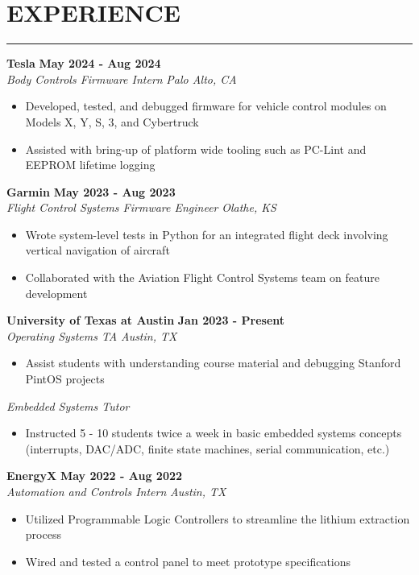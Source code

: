 \documentclass{article}
\newcommand{\sectionHeader}[1]{%
    \vspace{-1.5\baselineskip}
    \section*{\MakeUppercase{\large #1}} %
    \vspace{-1.75\baselineskip} %
    \color{teal}
    \rule{\textwidth}{2pt} %
    \color{black}
    \vspace{-1.5\baselineskip}
}
\newcommand{\role}[3]{
    \textit{#1} \hfill \textit{#2} \\[0pt]
    #3
}
\newcommand{\sectionItem}[5]{ %
    \textbf{#1} \hfill \textbf{#2} \\[0pt]
    \role{#3}{#4}{#5}    %
    \vspace{10pt}
}
\begin{document}
\sectionHeader{experience}
\begin{flushleft}
    \sectionItem{Tesla}{May 2024 - Aug 2024}{Body Controls Firmware Intern}{Palo Alto, CA}{
        \begin{itemize}
            \item[\textbullet] Developed, tested, and debugged firmware for vehicle control modules on Models X, Y, S, 3, and Cybertruck
            \item[\textbullet] Assisted with bring-up of platform wide tooling such as PC-Lint and EEPROM lifetime logging
        \end{itemize}   
    }
    
    \sectionItem{Garmin}{May 2023 - Aug 2023}{Flight Control Systems Firmware Engineer}{Olathe, KS}{
        \begin{itemize}
            \item[\textbullet] Wrote system-level tests in Python for an integrated flight deck involving vertical navigation of aircraft
            \item[\textbullet] Collaborated with the Aviation Flight Control Systems team on feature development
        \end{itemize}
    }

    \sectionItem{University of Texas at Austin}{Jan 2023 - Present}{Operating Systems TA}{Austin, TX}{
        \begin{itemize}
            \item[\textbullet] Assist students with understanding course material and debugging Stanford PintOS projects
        \end{itemize}
        \vspace{5pt}
        \role{Embedded Systems Tutor}{}{
            \begin{itemize}
                \item[\textbullet] Instructed 5 - 10 students twice a week in basic embedded systems concepts (interrupts, DAC/ADC, finite state machines, serial communication, etc.)
            \end{itemize}
        }
    }

    \sectionItem{EnergyX}{May 2022 - Aug 2022}{Automation and Controls Intern}{Austin, TX}{
        \begin{itemize}
            \item[\textbullet] Utilized Programmable Logic Controllers to streamline the lithium extraction process
            \item[\textbullet] Wired and tested a control panel to meet prototype specifications
        \end{itemize}
    }
\end{flushleft}
\end{document}
